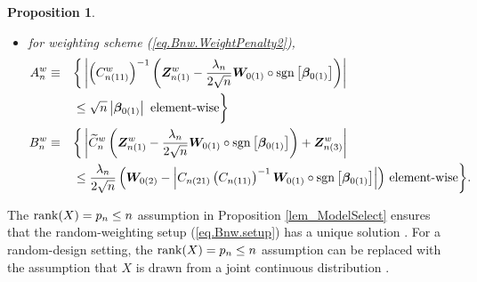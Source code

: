 \documentclass[ejs,authoryear,linksfromyear]{imsart}
\newcommand{\cnwa}{C_{n(11)}^w}
\newcommand{\znwa}{\bm{Z}_{n(1)}^w}
\newcommand{\znwc}{\bm{Z}_{n(3)}^w}
\numberwithin{equation}{section}
\theoremstyle{plain}
\newtheorem{proposition}{Proposition}[section]
\begin{document}
\begin{proposition}
\begin{itemize}[wide]
		\begin{align*}
		A_n^w &\equiv  
		\left\{
		\left\vert 
		\left( \cnwa \right)^{-1} 
		\left(
		\znwa - 
		\dfrac{\lambda_n W_0}{2 \sqrt{n}} 
		\text{sgn} \left[ \bm{\beta}_{0(1)} \right]
		\right)
		\right\vert
		\leq  \sqrt{n}
		\left\vert \bm{\beta}_{0(1)} \right\vert
		\,\, \text{{\rm element-wise}}
		\right\} \\
		B_n^w &\equiv 
		\left\{
		\left\vert 
		\widetilde{C}^w_n 
		\left(
		\znwa - 
		\dfrac{\lambda_n W_0}{2 \sqrt{n}} 
		\text{sgn} \left[ \bm{\beta}_{0(1)} \right]
		\right)
		+ \znwc 
		\right\vert
		\leq 
		\dfrac{\lambda_n W_0}{2 \sqrt{n}} 
		\bm{\eta} 
		\,\, \text{{\rm element-wise}}
		\right\}; 
		\end{align*}
		\item [(c)] for weighting scheme (\ref{eq.Bnw.WeightPenalty2}),
			\begin{alignat*}{2}
		A_n^w &\equiv  
		&&\bigg\{
		\left\vert 
		\left( \cnwa \right)^{-1} 
		\left(
		\znwa - 
		\dfrac{\lambda_n}{2 \sqrt{n}}
		\bm{W}_{0(1)} \circ
		\text{sgn} \left[ \bm{\beta}_{0(1)} \right]
		\right)
		\right\vert \\
		& &&\leq  \sqrt{n}
		\left\vert \bm{\beta}_{0(1)} \right\vert
		\,\, \text{{\rm element-wise}}
		\bigg\} \\
		B_n^w &\equiv 
		&&\bigg\{
		\left\vert 
		\widetilde{C}^w_n 
		\left(
		\znwa - 
		\dfrac{\lambda_n}{2 \sqrt{n}} 
		\bm{W}_{0(1)} \circ
		\text{sgn} \left[ \bm{\beta}_{0(1)} \right]
		\right)
		+ \znwc 
		\right\vert \\
		& &&\leq 
		\dfrac{\lambda_n}{2 \sqrt{n}} 
		\left(
		\bm{W}_{0(2)} - 
		\left\vert
		C_{n(21)} 
		\left( C_{n(11)} \right)^{-1}
		\bm{W}_{0(1)} \circ
		\text{sgn} \left[ \bm{\beta}_{0(1)} \right]
		\right\vert
		\right)
		\, \text{{\rm element-wise}}
		\bigg\}. 
		\end{alignat*}
	\end{itemize}
\end{proposition}

The ${\rm rank}(X) = p_n \leq n$ assumption in Proposition \ref{lem_ModelSelect} ensures that the random-weighting setup (\ref{eq.Bnw.setup}) has a unique solution \citep{Osborne2000}. For a random-design setting, the ${\rm rank}(X) = p_n \leq n$ assumption can be replaced with the assumption that $X$ is drawn from a joint continuous distribution \citep{LassoUnique}.    
\end{document}

